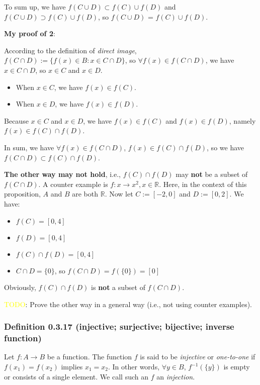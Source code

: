 \documentclass[12pt, letterpaper, oneside]{book}
\begin{document}
To sum up, we have $f(C \cup D) \subset f(C) \cup f(D)$ and $f(C \cup D)
\supset f(C) \cup f(D)$, so $f(C \cup D)$ = $f(C) \cup f(D)$.

\textbf{My proof of 2}:

According to the definition of \textit{direct image}, $f(C \cap D) := \{f(x)
\in B: x \in C \cap D\}$, so $\forall f(x) \in f(C \cap D)$, we have $x \in C
\cap D$, so $x \in C$ and $x \in D$.

\begin{itemize}
  \item When $x \in C$, we have $f(x) \in f(C)$.
  \item When $x \in D$, we have $f(x) \in f(D)$.
\end{itemize}

Because $x \in C$ and $x \in D$, we have $f(x) \in f(C)$ and $f(x) \in f(D)$,
namely $f(x) \in f(C) \cap f(D)$.

In sum, we have $\forall f(x) \in f(C \cap D)$, $f(x) \in f(C) \cap f(D)$, so
we have $f(C \cap D) \subset f(C) \cap f(D)$.

\textbf{The other way may not hold}, i.e., $f(C) \cap f(D)$ may \textbf{not} be
a subset of $f(C \cap D)$. A counter example is $f: x \rightarrow x^2, x \in
\mathbb{R}$. Here, in the context of this proposition, $A$ and $B$ are both
$\mathbb{R}$. Now let $C := [-2, 0]$ and $D := [0, 2]$. We have:

\begin{itemize}
  \item $f(C) = [0, 4]$
  \item $f(D) = [0, 4]$
  \item $f(C) \cap f(D) = [0, 4]$
  \item $C \cap D = \{0\}$, so $f(C \cap D) = f(\{0\}) = [0]$
\end{itemize}

Obviously, $f(C) \cap f(D)$ is \textbf{not} a subset of $f(C \cap D)$.

\colorbox{red!100}{\textcolor{yellow}{TODO}}: Prove the other way in a general
way (i.e., not using counter examples).

\subsubsection{
  Definition 0.3.17 (injective; surjective; bijective; inverse function)
}

Let $f: A \rightarrow B$ be a function. The function $f$ is said to be
\textit{injective} or \textit{one-to-one} if $f(x_1) = f(x_2)$ implies $x_1 =
x_2$. In other words, $\forall y \in B$, $f^{-1}(\{y\})$ is empty or consists
of a single element. We call such an $f$ an \textit{injection}.
\end{document}
